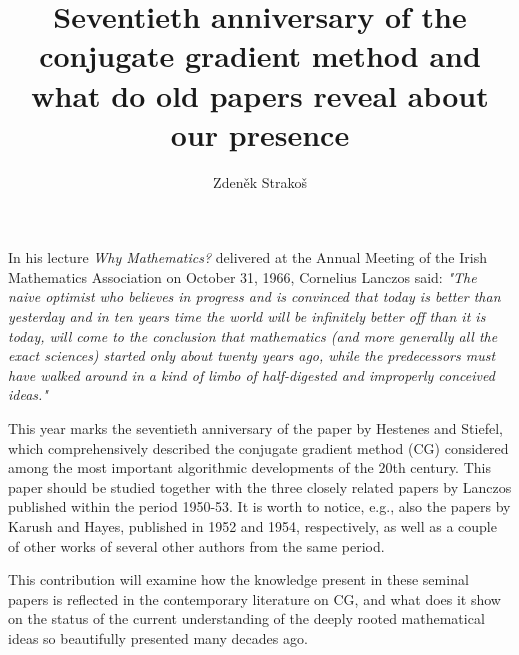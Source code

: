\documentclass[a4paper]{amsart}
\date{}
\begin{document}
\title{Seventieth anniversary of the conjugate gradient method and what do old papers reveal about our presence}
\author{Zden\v{e}k Strako\v{s}}
\address{ Charles University, Prague}

\maketitle

In his lecture {\em Why Mathematics?} delivered at the Annual Meeting of the Irish Mathematics Association on October 31, 1966, Cornelius Lanczos said: {\em "The naive optimist who believes in progress and is convinced that today is better than yesterday and in ten years time the world will be infinitely better off than it is today, will come to the conclusion that mathematics (and more generally all the exact sciences) started only about twenty years ago, while the predecessors must have walked around in a kind of limbo of half-digested and improperly conceived ideas."}

This year marks the seventieth anniversary of the paper by Hestenes and Stiefel, which comprehensively described the conjugate gradient method (CG) considered among the most important algorithmic developments of the $20$th century. This paper should be studied together with the three closely related papers by Lanczos published within the period 1950-53. It is worth to notice, e.g., also the papers by Karush and Hayes, published in 1952 and 1954, respectively, as well as a couple of other works of several other authors from the same period.

This contribution will examine how the knowledge present in these seminal papers is reflected in the contemporary literature on CG, and what does it show on the status of the current understanding of the deeply rooted mathematical ideas so beautifully presented many decades ago.
\end{document}
